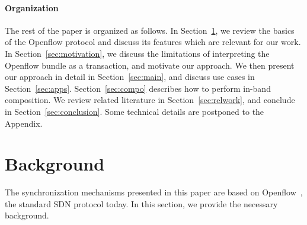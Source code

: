 \documentclass[conference]{sigcomm-alternate}
\begin{document}
\paragraph{Organization}
The rest of the paper is organized as follows.
In Section~\ref{sec:background}, we review the basics of the  Openflow
protocol and discuss its features which are relevant for our work.
In Section~\ref{sec:motivation}, we discuss the limitations of interpreting
the Openflow bundle as a transaction, and motivate our approach.
We then present our approach in detail in Section~\ref{sec:main}, and discuss use cases in Section~\ref{sec:apps}.
Section~\ref{sec:compo} describes how to perform in-band composition.
We review related literature in Section~\ref{sec:relwork}, and conclude
in Section~\ref{sec:conclusion}. Some technical details are postponed
to the Appendix.


\section{Background}\label{sec:background}

The synchronization mechanisms presented in this paper
are based on Openflow~\cite{of-spec}, the standard SDN protocol today. In this section,
we provide the necessary background.
\end{document}
